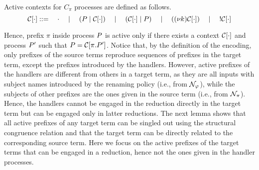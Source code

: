 \begin{definition}\label{def:active_contexts}
 Active contexts for $C_\pi$ processes are defined as follows.
\[
\mathcal{C}[\cdot]::= \quad\cdot \quad\;|\;\quad (P\;|\;\mathcal{C}[\cdot]) \quad\;|\;\quad (\mathcal{C}[\cdot]\;|\;P) \quad\;|\;\quad ((\nu k)\mathcal{C}[\cdot]) \quad\;|\;\quad ! \mathcal{C}[\cdot]
\]
\end{definition}

Hence, prefix $\pi$ inside process $P$ is active only if there exists a context $\mathcal{C}[\cdot]$ and process $P'$ such that $P=\mathcal{C}[\pi.P']$.
Notice that, by the definition of the encoding, only prefixes of the source terms reproduce sequences of prefixes in the target term, except the prefixes introduced by the handlers. However, active prefixes of the handlers are different from others in a target term, as they are all inputs with subject names introduced by the renaming policy (i.e., from ${\cal N}_\varphi$), while the subjects of other prefixes are the ones given in the source term (i.e., from ${\cal N}_\pi$). Hence, the handlers cannot be engaged in the reduction directly in the target term but can be engaged only in latter reductions.
The next lemma shows that all active prefixes of any target term can be singled out using the structural congruence relation and that the target term can be directly related to the corresponding source term. Here we focus on the active prefixes of the target terms that can be engaged in a reduction, hence not the ones given in the handler processes.



